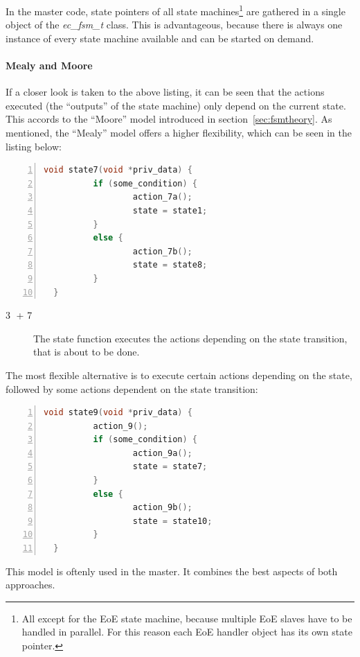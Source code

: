 \documentclass[a4paper,12pt,BCOR6mm,bibtotoc,idxtotoc]{scrbook}
\begin{document}
In the master code, state pointers of all state machines\footnote{All
  except for the EoE state machine, because multiple EoE slaves have
  to be handled in parallel. For this reason each EoE handler object
  has its own state pointer.} are gathered in a single object of the
\textit{ec\_fsm\_t} class. This is advantageous, because there is
always one instance of every state machine available and can be
started on demand.

\paragraph{Mealy and Moore}

If a closer look is taken to the above listing, it can be seen that
the actions executed (the ``outputs'' of the state machine) only
depend on the current state. This accords to the ``Moore'' model
introduced in section~\ref{sec:fsmtheory}. As mentioned, the ``Mealy''
model offers a higher flexibility, which can be seen in the listing
below:

\begin{lstlisting}[language=C,numbers=left]
  void state7(void *priv_data) {
          if (some_condition) {
                  action_7a();
                  state = state1;
          }
          else {
                  action_7b();
                  state = state8;
          }
  }
\end{lstlisting}

\begin{description}
\item[\normalfont\textcircled{\tiny 3} + \textcircled{\tiny 7}] The
  state function executes the actions depending on the state
  transition, that is about to be done.
\end{description}

The most flexible alternative is to execute certain actions depending
on the state, followed by some actions dependent on the state
transition:

\begin{lstlisting}[language=C,numbers=left]
  void state9(void *priv_data) {
          action_9();
          if (some_condition) {
                  action_9a();
                  state = state7;
          }
          else {
                  action_9b();
                  state = state10;
          }
  }
\end{lstlisting}

This model is oftenly used in the master. It combines the best aspects
of both approaches.
\end{document}
